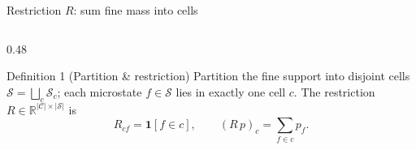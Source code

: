 \documentclass[10pt,aspectratio=169]{beamer}
\newcommand{\Sset}{\mathcal{S}}
\begin{document}
\begin{frame}{Restriction $R$: sum fine mass into cells}

  \begin{columns}[T]
    \begin{column}{0.48\textwidth}
      \begin{block}{Definition 1 (Partition \& restriction)}\small
        Partition the fine support into disjoint cells $\Sset=\bigsqcup_c \Sset_c$;
        each microstate $f\in\Sset$ lies in exactly one cell $c$. The restriction
        $R\in\mathbb R^{|\mathcal C|\times|\Sset|}$ is
        \[
          R_{cf}=\mathbf 1[f\in c],\qquad
          (R\,p)_c=\sum_{f\in c}p_f .
        \]
      \end{block}


\end{column}
\end{columns}
\end{frame}
\end{document}
